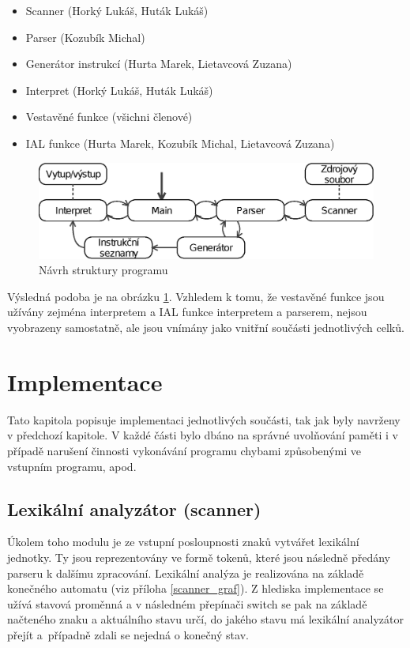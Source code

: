 \documentclass[12pt,a4paper,titlepage,final]{article}
\begin{document}
\begin{itemize}
	\item Scanner (Horký Lukáš, Huták Lukáš)
	\item Parser (Kozubík Michal)
	\item Generátor instrukcí (Hurta Marek, Lietavcová Zuzana)
	\item Interpret (Horký Lukáš, Huták Lukáš)
	\item Vestavěné funkce (všichni členové)
	\item IAL funkce (Hurta Marek, Kozubík Michal, Lietavcová Zuzana)
\end{itemize}

\begin{figure}
\begin{center}
  \includegraphics[scale = 0.7]{img/navrh.eps}
  \caption{Návrh struktury programu}
  \label{obr_navrh}
\end{center}
\end{figure}

Výsledná podoba je na obrázku \ref{obr_navrh}. Vzhledem k tomu, že vestavěné 
funkce jsou užívány zejména interpretem a IAL funkce interpretem a parserem, 
nejsou vyobrazeny samostatně, ale jsou vnímány jako vnitřní součásti 
jednotlivých celků.

\section{Implementace} \label{implementace}
Tato kapitola popisuje implementaci jednotlivých součásti, tak jak byly 
navrženy v předchozí kapitole. V každé části bylo dbáno na správné uvolňování 
paměti i v případě narušení činnosti vykonávání programu chybami způsobenými 
ve vstupním programu, apod.


\subsection{Lexikální analyzátor (scanner)}
Úkolem toho modulu je ze vstupní posloupnosti znaků vytvářet lexikální jednotky. 
Ty jsou reprezentovány ve formě tokenů, které jsou následně předány parseru k 
dalšímu zpracování. Lexikální analýza je realizována na základě konečného 
automatu (viz příloha \ref{scanner_graf}). Z hlediska implementace se užívá 
stavová proměnná a v následném přepínači switch se pak na základě načteného 
znaku a aktuálního stavu určí, do jakého stavu má lexikální analyzátor přejít 
a~případně zdali se nejedná o konečný stav.
\end{document}
